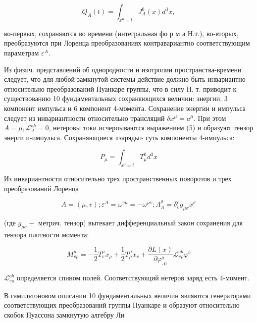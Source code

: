 \documentclass[10pt]{article}
\begin{document}
\[

Q_{A}(t)=\int_{x^{0}=t} J_{A}^{0}(x) d^{3} x,

\]



во-первых, сохраняются во времени (интегральная фо р м а Н.т.), во-вторых, преобразуются при Лоренца преобразованиях контравариантно соответствующим параметрам $\varepsilon^{A}$.



Из физич. представлений об однородности и изотропии пространства-времени следует, что для любой замкнутой системы действие должно быть инвариантно относительно преобразований Пуанкаре группы, что в силу Н. т. приводит к существованию 10 фундаментальных сохраняющихся величин: энергии, 3 компонент импульса и 6 компонент 4-момента. Сохранение энергии и импульса следует из инвариантности относительно трансляций $\delta x^{\mu}=a^{\mu}$. При этом $A=\mu, \mathscr{L}_{A}^{a b}=0$, нетеровы токи исчерпываются выражением (5) и образуют тензор энерги и-импульса. Сохраняющиеся «заряды» суть компоненты 4-импульса:



\[

P_{\mu}=\int_{x^{0}=t} T_{\mu}^{0} d^{3} x

\]



Из инвариантности относительно трех пространственных поворотов и трех преобразований Лоренца



\[

A=(\mu, v) ; \varepsilon^{A}=\omega^{v \mu}=-\omega^{\mu v} ; \Lambda_{A}^{\rho}=\delta_{v}^{\rho} g_{\mu \sigma} x^{\sigma}

\]



(где $g_{\mu \sigma}-$ метрич. тензор) вытекает дифференциальный закон сохранения для тензора плотности момента:



\[

M_{v \rho}^{\mu}=-\frac{1}{2} T_{v}^{\mu} x_{\rho}+\frac{1}{2} T_{\rho}^{\mu} x_{v}+\frac{\partial L(x)}{\partial \varphi_{, \mu}^{a}} \mathscr{L}_{v \rho}^{a b} \varphi^{b}

\]



$\mathscr{L}_{v \rho}^{a b}$ определяется спином полей. Соответствующий нетеров заряд есть 4-момент.



В гамильтоновом описании 10 фундаментальных величин являются генераторами соответствующих преобразований группы Пуанкаре и образуют относительно скобок Пуассона замкнутую алгебру Ли
\end{document}
